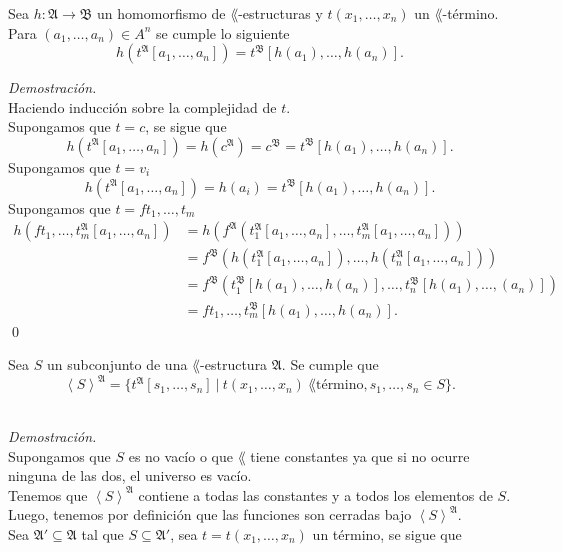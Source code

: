\newpage
\begin{lemma}
  Sea $h : \mathfrak{A} \to \mathfrak{B}$ un homomorfismo de $\lang$-estructuras y $t (x_1, \dots, x_n)$ un $\lang$-t\'ermino. 
  Para $(a_1, \dots, a_n) \in A^n$ se cumple lo siguiente
  \[ h(t^{\mathfrak{A}} [a_1, \dots, a_n]) = t^{\mathfrak{B}} [h(a_1), \dots, h(a_n)]. \]
\end{lemma}
\emph{Demostraci\'on.}\\
Haciendo inducci\'on sobre la complejidad de $t$.\\
Supongamos que $t = c$, se sigue que 
\[ h (t^{\mathfrak{A}} [a_1, \dots, a_n]) = h (c^{\mathfrak{A}}) = c^{\mathfrak{B}} = t^{\mathfrak{B}} [h(a_1), \dots, h(a_n)]. \]
Supongamos que $t = v_i$
\[ h(t^{\mathfrak{A}} [a_1, \dots, a_n]) = h(a_i) = t^{\mathfrak{B}} [h(a_1), \dots, h(a_n)]. \]
Supongamos que $t = f t_1 ,\dots, t_m$ 
\begin{align*}
 h(f t_1, \dots, t_m^{\mathfrak{A}} [a_1, \dots, a_n]) &= h (f^{\mathfrak{A}} (t_1^{\mathfrak{A}} [a_1, \dots, a_n], \dots, t_m^{\mathfrak{A}} [a_1, \dots, a_n])) \\
  &= f^{\mathfrak{B}} (h(t_1^{\mathfrak{A}} [a_1, \dots, a_n] ), \dots,  h(t_n^{\mathfrak{A}} [a_1, \dots, a_n] ))\\
  &= f^{\mathfrak{B}} (t_1^{\mathfrak{B}} [h(a_1), \dots, h(a_n)] , \dots,  t_n^{\mathfrak{B}} [h(a_1), \dots, (a_n)] )\\
  &= f t_1, \dots, t_m^{\mathfrak{B}} [h(a_1), \dots, h(a_n)].
\end{align*} \qed
\begin{lemma}
  Sea $S$ un subconjunto de una $\lang$-estructura $\mathfrak{A}$. Se cumple que 
  \[ \left< S \right>^{\mathfrak{A}} = \{ t^{\mathfrak{A}} [s_1, \dots, s_n] \ | \ t(x_1, \dots, x_n) \ \lang\text{t\'ermino}, s_1, \dots, s_n \in S \}. \]
\end{lemma}\\
\emph{Demostraci\'on.}\\
Supongamos que $S$ es no vac\'io o que $\lang$ tiene constantes ya que si no ocurre ninguna de las dos, el universo es vac\'io.\\
Tenemos que $\left< S \right>^{\mathfrak{A}}$ contiene a todas las constantes y a todos los elementos de $S$.
Luego, tenemos por definici\'on que las funciones son cerradas bajo $\left< S \right>^{\mathfrak{A}}$.\\
Sea $\mathfrak{A}' \subseteq \mathfrak{A}$ tal que $S \subseteq \mathfrak{A}'$, sea $t = t(x_1, \dots, x_n)$ un t\'ermino, se sigue que\\
